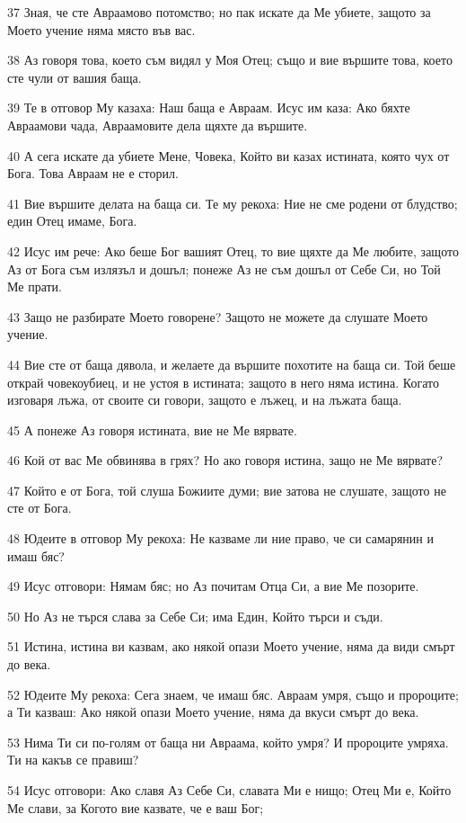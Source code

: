 \par 37 Зная, че сте Авраамово потомство; но пак искате да Ме убиете, защото за Моето учение няма място във вас.
\par 38 Аз говоря това, което съм видял у Моя Отец; също и вие вършите това, което сте чули от вашия баща.
\par 39 Те в отговор Му казаха: Наш баща е Авраам. Исус им каза: Ако бяхте Авраамови чада, Авраамовите дела щяхте да вършите.
\par 40 А сега искате да убиете Мене, Човека, Който ви казах истината, която чух от Бога. Това Авраам не е сторил.
\par 41 Вие вършите делата на баща си. Те му рекоха: Ние не сме родени от блудство; един Отец имаме, Бога.
\par 42 Исус им рече: Ако беше Бог вашият Отец, то вие щяхте да Ме любите, защото Аз от Бога съм излязъл и дошъл; понеже Аз не съм дошъл от Себе Си, но Той Ме прати.
\par 43 Защо не разбирате Моето говорене? Защото не можете да слушате Моето учение.
\par 44 Вие сте от баща дявола, и желаете да вършите похотите на баща си. Той беше открай човекоубиец, и не устоя в истината; защото в него няма истина. Когато изговаря лъжа, от своите си говори, защото е лъжец, и на лъжата баща.
\par 45 А понеже Аз говоря истината, вие не Ме вярвате.
\par 46 Кой от вас Ме обвинява в грях? Но ако говоря истина, защо не Ме вярвате?
\par 47 Който е от Бога, той слуша Божиите думи; вие затова не слушате, защото не сте от Бога.
\par 48 Юдеите в отговор Му рекоха: Не казваме ли ние право, че си самарянин и имаш бяс?
\par 49 Исус отговори: Нямам бяс; но Аз почитам Отца Си, а вие Ме позорите.
\par 50 Но Аз не търся слава за Себе Си; има Един, Който търси и съди.
\par 51 Истина, истина ви казвам, ако някой опази Моето учение, няма да види смърт до века.
\par 52 Юдеите Му рекоха: Сега знаем, че имаш бяс. Авраам умря, също и пророците; а Ти казваш: Ако някой опази Моето учение, няма да вкуси смърт до века.
\par 53 Нима Ти си по-голям от баща ни Авраама, който умря? И пророците умряха. Ти на какъв се правиш?
\par 54 Исус отговори: Ако славя Аз Себе Си, славата Ми е нищо; Отец Ми е, Който Ме слави, за Когото вие казвате, че е ваш Бог;
